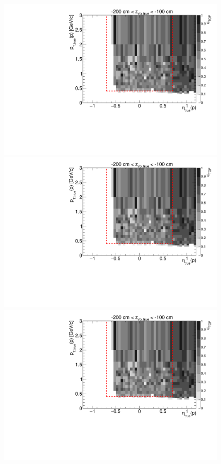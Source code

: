 \begin{figure}[hb]
{  \includegraphics[width=\linewidth,page=6]{graphics/eff/Eff2D_TOF_proton_Plus.pdf}\\
  \includegraphics[width=\linewidth,page=8]{graphics/eff/Eff2D_TOF_proton_Plus.pdf}\\
  \includegraphics[width=\linewidth,page=10]{graphics/eff/Eff2D_TOF_proton_Plus.pdf}
}%
\end{figure}
